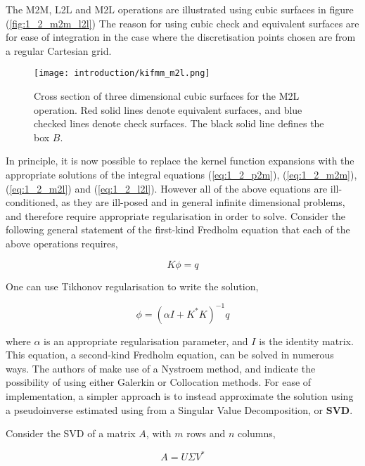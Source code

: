 The M2M, L2L and M2L operations are illustrated using cubic surfaces in figure (\ref{fig:1_2_m2m_l2l})
The reason for using cubic check and equivalent surfaces are for ease of integration
in the case where the discretisation points chosen are from a regular Cartesian
grid.

\begin{figure}[!h]
    \centering
    {\texttt{[image: introduction/kifmm\_m2l.png]}}
    \caption{Cross section of three dimensional cubic surfaces for the M2L operation.
    Red solid lines denote equivalent surfaces, and blue checked lines denote check surfaces.
    The black solid line defines the box $B$.}
  \label{fig:1_2_m2l}
\end{figure}

In principle, it is now possible to replace the kernel function expansions with
the appropriate solutions of the integral equations (\ref{eq:1_2_p2m}),
(\ref{eq:1_2_m2m}), (\ref{eq:1_2_m2l}) and (\ref{eq:1_2_l2l}). However all of
the above equations are ill-conditioned, as they are ill-posed and in general infinite
dimensional problems, and therefore require appropriate regularisation in order to solve.
Consider the following general statement of the first-kind Fredholm equation
that each of the above operations requires,

\begin{equation}
K \phi = q
\label{eq:1_2_first_kind_fredholm}
\end{equation}

One can use Tikhonov regularisation to write the solution,

\begin{equation}
\phi = (\alpha I + K^*K)^{-1}q
\end{equation}

where $\alpha$ is an appropriate regularisation parameter, and $I$ is the identity
matrix. This equation, a second-kind Fredholm equation, can be solved in numerous
ways. The authors of \cite{Ying:2004:JCP} make use of a Nystroem method, and indicate
the possibility of using either Galerkin or Collocation methods. For ease of
implementation, a simpler approach is to instead approximate the solution using a pseudoinverse
estimated using from a Singular Value Decomposition, or \textbf{\gls{SVD}}.

Consider the SVD of a matrix $A$, with $m$ rows and $n$ columns,

\begin{equation}
    A = U \Sigma V^*
\end{equation}

